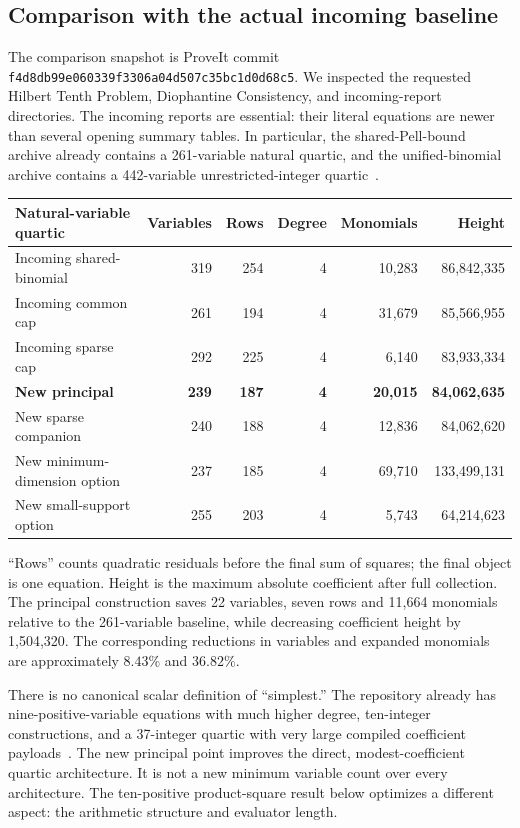 \documentclass[11pt]{article}
\theoremstyle{definition}\newtheorem{definition}[theorem]{Definition}
\theoremstyle{remark}\newtheorem{remark}[theorem]{Remark}
\newcommand{\code}[1]{\nolinkurl{#1}}
\begin{document}
\subsection{Comparison with the actual incoming baseline}

The comparison snapshot is ProveIt commit
\code{f4d8db99e060339f3306a04d507c35bc1d0d68c5}. We inspected the requested Hilbert Tenth Problem, Diophantine Consistency, and incoming-report directories. The incoming reports are essential: their literal equations are newer than several opening summary tables. In particular, the shared-Pell-bound archive already contains a 261-variable natural quartic, and the unified-binomial archive contains a 442-variable unrestricted-integer quartic~\cite{repo,cap,unified}.

\begin{center}\small
\begin{tabular}{lrrrrr}
\toprule
Natural-variable quartic & Variables & Rows & Degree & Monomials & Height\\
\midrule
Incoming shared-binomial & 319 & 254 & 4 & 10,283 & 86,842,335\\
Incoming common cap & 261 & 194 & 4 & 31,679 & 85,566,955\\
Incoming sparse cap & 292 & 225 & 4 & 6,140 & 83,933,334\\
\textbf{New principal} & \textbf{239} & \textbf{187} & \textbf{4} & \textbf{20,015} & \textbf{84,062,635}\\
New sparse companion & 240 & 188 & 4 & 12,836 & 84,062,620\\
New minimum-dimension option & 237 & 185 & 4 & 69,710 & 133,499,131\\
New small-support option & 255 & 203 & 4 & 5,743 & 64,214,623\\
\bottomrule
\end{tabular}
\end{center}

``Rows'' counts quadratic residuals before the final sum of squares; the final object is one equation. Height is the maximum absolute coefficient after full collection. The principal construction saves 22 variables, seven rows and 11,664 monomials relative to the 261-variable baseline, while decreasing coefficient height by 1,504,320. The corresponding reductions in variables and expanded monomials are approximately $8.43\%$ and $36.82\%$.

There is no canonical scalar definition of ``simplest.'' The repository already has nine-positive-variable equations with much higher degree, ten-integer constructions, and a 37-integer quartic with very large compiled coefficient payloads~\cite{catalogue}. The new principal point improves the direct, modest-coefficient quartic architecture. It is not a new minimum variable count over every architecture. The ten-positive product-square result below optimizes a different aspect: the arithmetic structure and evaluator length.
\end{document}
